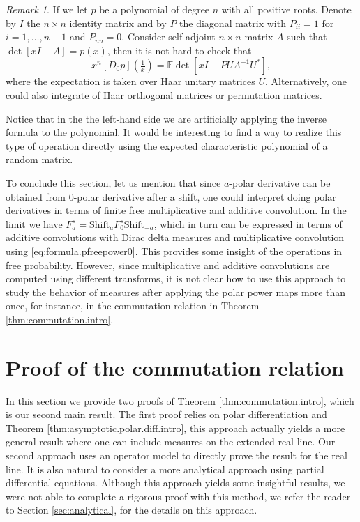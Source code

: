 \documentclass[reqno,11pt]{amsart}
\theoremstyle{remark}
\newtheorem{remark}[theorem]{Remark}
\newcommand{\ee}{\mathbb{E}}
\newcommand{\shift}[1]{\mbox{Shift}_{#1}}
\newcommand{\polar}[1]{D_{#1}}
\newcommand{\pfreepower}[2]{F_{#1}^{#2}}
\begin{document}
\begin{remark}
If we let $p$ be a polynomial of degree $n$ with all positive roots. Denote by $I$ the $n\times n$ identity matrix and by $P$ the diagonal matrix with $P_{ii}=1$ for $i=1,\dots, n-1$ and $P_{nn}=0$. Consider self-adjoint $n\times n$ matrix $A$ such that $\det[xI-A]=p(x)$, then it is not hard to check that
$$ x^n [\polar{0} p](\tfrac{1}{x}) = \ee \det [xI-PUA^{-1}U^*],$$
where the expectation is taken over Haar unitary matrices $U$. Alternatively, one could also integrate of Haar orthogonal matrices or permutation matrices.

Notice that in the the left-hand side we are artificially applying the inverse formula to the polynomial. It would be interesting to find a way to realize this type of operation directly using the expected characteristic polynomial of a random matrix.
\end{remark}


To conclude this section, let us mention that since $a$-polar derivative can be obtained from $0$-polar derivative after a shift, one could interpret doing polar derivatives in terms of finite free multiplicative and additive convolution. In the limit we have $\pfreepower{a}{s}= \shift{a} \pfreepower{0}{s} \shift{-a}$, which in turn can be expressed in terms of additive convolutions with Dirac delta measures and multiplicative convolution using \eqref{eq:formula.pfreepower0}. This provides some insight of the operations in free probability. However, since multiplicative and additive convolutions are computed using different transforms, it is not clear how to use this approach to study the behavior of measures after applying the polar power maps more than once, for instance, in the commutation relation in Theorem \ref{thm:commutation.intro}. 



\section{Proof of the commutation relation}\label{sec:pfofcommutationrelation}

In this section we provide two proofs of Theorem \ref{thm:commutation.intro}, which is our second main result. The first proof relies on polar differentiation and Theorem \ref{thm:asymptotic.polar.diff.intro}, this approach actually yields a more general result where one can include measures on the extended real line. Our second approach uses an operator model to directly prove the result for the real line. It is also natural to consider a more analytical approach using partial differential equations. Although this approach yields some insightful results, we were not able to complete a rigorous proof with this method, we refer the reader to Section \ref{sec:analytical}, for the details on this approach.
\end{document}

